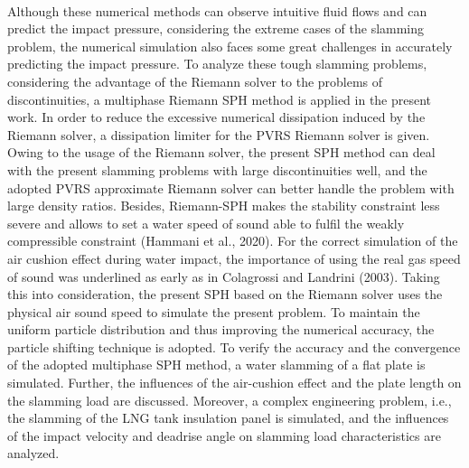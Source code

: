 \documentclass[UTF8]{ctexart}
\begin{document}
\paragraph{\quad}Although these numerical methods can observe intuitive fluid flows and can predict 
                the impact pressure, considering the extreme cases of the slamming problem, the numerical 
                simulation also faces some great challenges in accurately predicting the impact pressure. 
                To analyze these tough slamming problems, considering the advantage of the Riemann solver 
                to the problems of discontinuities, a multiphase Riemann SPH method is applied in the 
                present work. In order to reduce the excessive numerical dissipation induced by the 
                Riemann solver, a dissipation limiter for the PVRS Riemann solver is given. Owing to the 
                usage of the Riemann solver, the present SPH method can deal with the present slamming 
                problems with large discontinuities well, and the adopted PVRS approximate Riemann solver 
                can better handle the problem with large density ratios. Besides, Riemann-SPH makes the 
                stability constraint less severe and allows to set a water speed of sound able to fulfil 
                the weakly compressible constraint (Hammani et al., 2020). For the correct simulation of 
                the air cushion effect during water impact, the importance of using the real gas speed of 
                sound was underlined as early as in Colagrossi and Landrini (2003). Taking this into 
                consideration, the present SPH based on the Riemann solver uses the physical air sound 
                speed to simulate the present problem. To maintain the uniform particle distribution and 
                thus improving the numerical accuracy, the particle shifting technique is adopted. 
                To verify the accuracy and the convergence of the adopted multiphase SPH method, a water 
                slamming of a flat plate is simulated. Further, the influences of the air-cushion effect 
                and the plate length on the slamming load are discussed. Moreover, a complex engineering 
                problem, i.e., the slamming of the LNG tank insulation panel is simulated, and the 
                influences of the impact velocity and deadrise angle on slamming load characteristics are analyzed.
\end{document}
